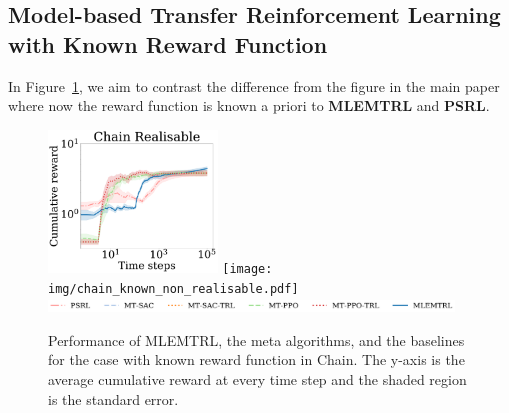 \subsection{Model-based Transfer Reinforcement Learning with Known Reward Function}
In Figure~\ref{fig:known_reward_results}, we aim to contrast the difference from the figure in the main paper where now the reward function is known a priori to \textbf{MLEMTRL} and \textbf{PSRL}.
\begin{figure}[h!]
    \centering
    \includegraphics[width=0.4\textwidth]{img/chain_known_realisable.pdf} 
    \texttt{[image: img/chain\_known\_non\_realisable.pdf]}\\
    \includegraphics[width=0.96\textwidth]{img/lqr_legend.pdf}
    \caption{Performance of MLEMTRL, the meta algorithms, and the baselines for the case with known reward function in Chain. The y-axis is the average cumulative reward at every time step and the shaded region is the standard error.}\label{fig:known_reward_results}
\end{figure}